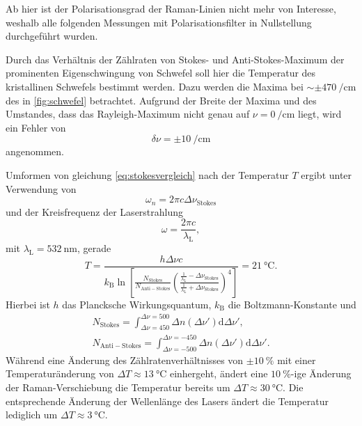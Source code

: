 \documentclass[../bericht.tex]{subfiles}
\begin{document}
    Ab hier ist der Polarisationsgrad der Raman-Linien nicht mehr von Interesse, weshalb alle folgenden Messungen mit Polarisationsfilter in Nullstellung durchgeführt wurden.

    Durch das Verhältnis der Zählraten von Stokes- und Anti-Stokes-Maximum der prominenten Eigenschwingung von Schwefel soll hier die Temperatur des kristallinen Schwefels bestimmt werden. Dazu werden die Maxima bei $\sim\pm\SI{470}{\per\centi\meter}$ des in \cref{fig:schwefel} betrachtet. Aufgrund der Breite der Maxima und des Umstandes, dass das Rayleigh-Maximum nicht genau auf $\nu=\SI{0}{\per\centi\meter}$ liegt, wird ein Fehler von
    \begin{equation*}
      \delta \nu = \pm\SI{10}{\per\centi\meter}
    \end{equation*}
    angenommen.

    Umformen von gleichung \cref{eq:stokesvergleich} nach der Temperatur $T$ ergibt unter Verwendung von
    \begin{equation*}
      \omega_n = 2\pi c \Delta \nu_\mathrm{Stokes}
    \end{equation*}
    und der Kreisfrequenz der Laserstrahlung
    \begin{equation*}
      \omega = \frac{2\pi c}{\lambda_\mathrm{L}},
    \end{equation*}
    mit $\lambda_\mathrm{L}=\SI{532}{\nano\meter}$, gerade
    \begin{equation*}
      T = \frac{h \Delta \nu  c}{k_\mathrm{B}\ln\left[ \frac{N_\mathrm{Stokes}}{N_\mathrm{Anti-Stokes}} \left( \frac{\frac{1}{\lambda_\mathrm{L}} - \Delta \nu_\mathrm{Stokes}}{\frac{1}{\lambda_\mathrm{L}}+\Delta \nu_\mathrm{Stokes}} \right)^4 \right]}=\SI{21}{\celsius}.
    \end{equation*}
    Hierbei ist $h$ das Plancksche Wirkungsquantum, $k_\mathrm{B}$ die Boltzmann-Konstante und
    \begin{align*}
      N_\mathrm{Stokes}=\int_{\Delta \nu = 450}^{\Delta \nu = 500}\Delta n(\Delta \nu') \mathrm{d}\Delta\nu', \\
      N_\mathrm{Anti-Stokes}=\int_{\Delta \nu = -500}^{\Delta \nu = -450}\Delta n(\Delta \nu') \mathrm{d}\Delta\nu'.
    \end{align*}
    Während eine Änderung des Zählratenverhältnisses von $\pm\SI{10}{\percent}$ mit einer Temperaturänderung von $\Delta T \approx \SI{13}{\celsius} $ einhergeht, ändert eine $\SI{10}{\percent}$-ige Änderung der Raman-Verschiebung die Temperatur bereits um $\Delta T\approx\SI{30}{\celsius}$. Die entsprechende Änderung der Wellenlänge des Lasers ändert die Temperatur lediglich um $\Delta T\approx \SI{3}{\celsius}$.
\end{document}
